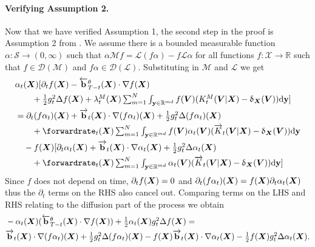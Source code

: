 \paragraph{Verifying Assumption 2.} Now that we have verified Assumption 1, the
second step in the proof is Assumption 2 from \citet{benton2022denoising}. We
assume there is a bounded measurable function
$\alpha : \mathcal{S} \rightarrow (0, \infty)$ such that
$\alpha \mathcal{M} f = \mathcal{L}(f \alpha) - f \mathcal{L}\alpha$ for all
functions $f : \mathcal{X} \rightarrow \mathbb{R}$ such that
$f \in \mathcal{D}(\mathcal{M})$ and $f \alpha \in
\mathcal{D}(\mathcal{L})$. Substituting in $\mathcal{M}$ and $\mathcal{L}$ we
get
\begin{align}
  &\textstyle \alpha_t(\mX) [ \partial_t f(\mX) - \backwarddrift_{T-t}^\theta(\mX) \cdot \nabla f(\mX) \\
  & \qquad \textstyle + \frac{1}{2} g_{t}^2 \Delta f(\mX) + \mrate_t(\mX) \inty f(\mV) ( \mtk_t(\mV | \mX) - \updelta_{\mX}(\mV) ) \rmd \y ]\\
  &\textstyle = \partial_t( f \alpha_t) (\mX) + \forwarddrift_t(\mX) \cdot \nabla (f \alpha_t)(\mX) + \frac{1}{2} g_t^2 \Delta (f \alpha_t) (\mX)\\
  & \qquad \textstyle + \forwardrate_t(\mX) \inty f(\mV) \alpha_t(\mV) ( \ftk_t(\mV | \mX) - \updelta_{\mX}(\mV) ) \rmd \y\\
  &\textstyle  \quad - f(\mX) [ \partial_t \alpha_t(\mX) + \forwarddrift_t(\mX) \cdot \nabla \alpha_t(\mX) + \frac{1}{2} g_t^2 \Delta \alpha_t (\mX) \\
  & \qquad \textstyle + \forwardrate_t(\mX) \inty \alpha_t(\mV) ( \ftk_t(\mV | \mX) - \updelta_{\mX}(\mV) ) \rmd \y ] 
    \label{eq:assm2equality}
\end{align}
Since $f$ does not depend on time, $\partial_t f({\bm{X}}) = 0$ and $\partial_t(f \alpha_t) ({\bm{X}}) = f({\bm{X}}) \partial_t \alpha_t ({\bm{X}})$ thus the $\partial_t$ terms on the RHS also cancel out. Comparing terms on the LHS and RHS relating to the diffusion part of the process we obtain
\begin{align}
    &\textstyle - \alpha_t({\bm{X}}) ( \overleftarrow{\mathbf{b}}_{T-t}^\theta({\bm{X}}) \cdot \nabla f({\bm{X}})) + \frac{1}{2} \alpha_t({\bm{X}}) g_t^2 \Delta f({\bm{X}}) = \\
    &\textstyle \overrightarrow{\mathbf{b}}_t({\bm{X}}) \cdot \nabla(f \alpha_t) ({\bm{X}}) + \frac{1}{2} g_t^2 \Delta (f \alpha_t) ({\bm{X}}) - f({\bm{X}}) \overrightarrow{\mathbf{b}}_t({\bm{X}}) \cdot \nabla \alpha_t({\bm{X}}) - \frac{1}{2} f({\bm{X}}) g_t^2 \Delta \alpha_t({\bm{X}}) . 
\end{align}
